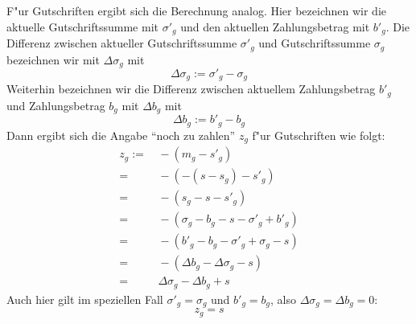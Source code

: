 \documentclass[a4paper]{article}
\numberwithin{equation}{section}
\begin{document}
\noindent F"ur Gutschriften ergibt sich die Berechnung analog. Hier bezeichnen
wir die aktuelle Gutschriftssumme mit $\sigma'_g$ und den aktuellen 
Zahlungsbetrag mit $b'_g$. Die Differenz zwischen aktueller Gutschriftssumme
$\sigma'_g$ und Gutschriftssumme $\sigma_g$ bezeichnen wir mit $\Delta\sigma_g$
mit
\begin{equation}\Delta\sigma_g := \sigma'_g - \sigma_g\end{equation}
Weiterhin bezeichnen wir die Differenz zwischen aktuellem Zahlungsbetrag $b'_g$
und Zahlungsbetrag $b_g$ mit $\Delta b_g$ mit
\begin{equation}\Delta b_g := b'_g - b_g\end{equation}
Dann ergibt sich die Angabe "`noch zu zahlen"' $z_g$ f"ur Gutschriften wie
folgt:
\begin{equation}
\begin{split}
  z_g := & \,-(m_g - s'_g) \\
    = & \,-(-(s - s_g) - s'_g) \\
    = & \,-(s_g - s - s'_g) \\
    = & \,-(\sigma_g - b_g - s - \sigma'_g + b'_g) \\
    = & \,-(b'_g - b_g - \sigma'_g + \sigma_g - s) \\
    = & \,-(\Delta b_g - \Delta\sigma_g - s) \\
    = & \,\Delta\sigma_g - \Delta b_g + s
\end{split}
\end{equation}
Auch hier gilt im speziellen Fall $\sigma'_g = \sigma_g$ und $b'_g = b_g$, also 
$\Delta\sigma_g = \Delta b_g = 0$:
\begin{equation}z_g = s\end{equation}



%
%
%
%
\end{document}

